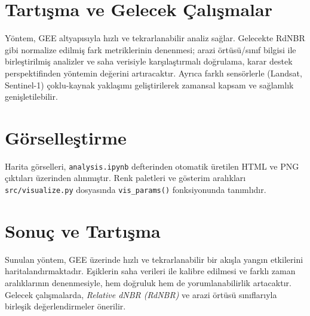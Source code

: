 \documentclass[11pt,a4paper]{article}
\begin{document}
\section{Tartışma ve Gelecek Çalışmalar}
Yöntem, GEE altyapısıyla hızlı ve tekrarlanabilir analiz sağlar. Gelecekte RdNBR gibi
normalize edilmiş fark metriklerinin denenmesi; arazi örtüsü/sınıf bilgisi ile
birleştirilmiş analizler ve saha verisiyle karşılaştırmalı doğrulama, karar destek
perspektifinden yöntemin değerini artıracaktır. Ayrıca farklı sensörlerle (Landsat,\,Sentinel-1)
çoklu-kaynak yaklaşımı geliştirilerek zamansal kapsam ve sağlamlık genişletilebilir.

\section{Görselleştirme}
Harita görselleri, \texttt{analysis.ipynb} defterinden otomatik üretilen HTML ve PNG
çıktıları üzerinden alınmıştır. Renk paletleri ve gösterim aralıkları \texttt{src/visualize.py}
dosyasında \texttt{vis\_params()} fonksiyonunda tanımlıdır.

\section{Sonuç ve Tartışma}
Sunulan yöntem, GEE üzerinde hızlı ve tekrarlanabilir bir akışla yangın etkilerini
haritalandırmaktadır. Eşiklerin saha verileri ile kalibre edilmesi ve farklı
zaman aralıklarının denenmesiyle, hem doğruluk hem de yorumlanabilirlik artacaktır.
Gelecek çalışmalarda, \emph{Relative dNBR (RdNBR)} ve arazi örtüsü sınıflarıyla
birleşik değerlendirmeler önerilir.
\end{document}

